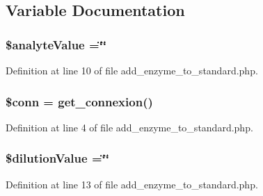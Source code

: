 \subsection{Variable Documentation}
\hypertarget{add__enzyme__to__standard_8php_aa0668b8f5734a61bcc5107303a90615a}{
\subsubsection[{\$analyte\-Value}]{\setlength{\rightskip}{0pt plus 5cm}\$analyte\-Value =\char`\"{}\char`\"{}}}\label{add__enzyme__to__standard_8php_aa0668b8f5734a61bcc5107303a90615a}


Definition at line 10 of file add\-\_\-enzyme\-\_\-to\-\_\-standard.\-php.

\hypertarget{add__enzyme__to__standard_8php_aa8a5a87b9c1a6a0819b88447cbe41877}{
\subsubsection[{\$conn}]{\setlength{\rightskip}{0pt plus 5cm}\$conn = {\bf get\-\_\-connexion}()}}\label{add__enzyme__to__standard_8php_aa8a5a87b9c1a6a0819b88447cbe41877}


Definition at line 4 of file add\-\_\-enzyme\-\_\-to\-\_\-standard.\-php.

\hypertarget{add__enzyme__to__standard_8php_ad5cb2bd1aacca5b8729d0dc753091153}{
\subsubsection[{\$dilution\-Value}]{\setlength{\rightskip}{0pt plus 5cm}\$dilution\-Value =\char`\"{}\char`\"{}}}\label{add__enzyme__to__standard_8php_ad5cb2bd1aacca5b8729d0dc753091153}


Definition at line 13 of file add\-\_\-enzyme\-\_\-to\-\_\-standard.\-php.

